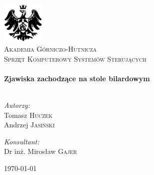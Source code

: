 \begin{titlepage}

\begin{center}

\includegraphics[width=0.15\textwidth]{./img/logo.eps}\\[1cm]

\textsc{\LARGE Akademia Górniczo-Hutnicza}\\[1.5cm]

\textsc{\Large Sprzęt Komputerowy Systemów Sterujących}\\[0.5cm]


\HRule \\[0.4cm]
{ \huge \bfseries Zjawiska zachodzące na stole bilardowym}\\[0.4cm]

\HRule \\[1.5cm]

\begin{minipage}{0.4\textwidth}
\begin{flushleft} \large
\emph{Autorzy:}\\
Tomasz \textsc{Huczek}\\
Andrzej \textsc{Jasiński}
\end{flushleft}
\end{minipage}
\begin{minipage}{0.4\textwidth}
\begin{flushright} \large
\emph{Konsultant:} \\
Dr inż. Mirosław \textsc{Gajer}
\end{flushright}
\end{minipage}

\vfill

{\large \today}

\end{center}

\end{titlepage}
